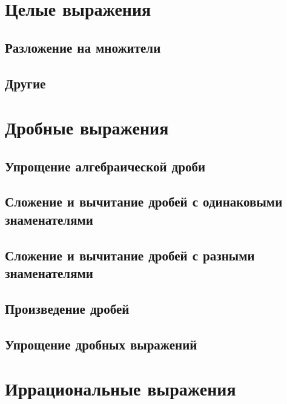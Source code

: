 \documentclass[10pt, a4paper]{article}
\begin{document}
\section{Целые выражения}
	\subsection{Разложение на множители}
	\subsection{Другие}
\section{Дробные выражения}
	\subsection{Упрощение алгебраической дроби}
	\subsection{Сложение и вычитание дробей с одинаковыми знаменателями}
	\subsection{Сложение и вычитание дробей с разными знаменателями}
	\subsection{Произведение дробей}
	\subsection{Упрощение дробных выражений}
\section{Иррациональные выражения}
\end{document}
